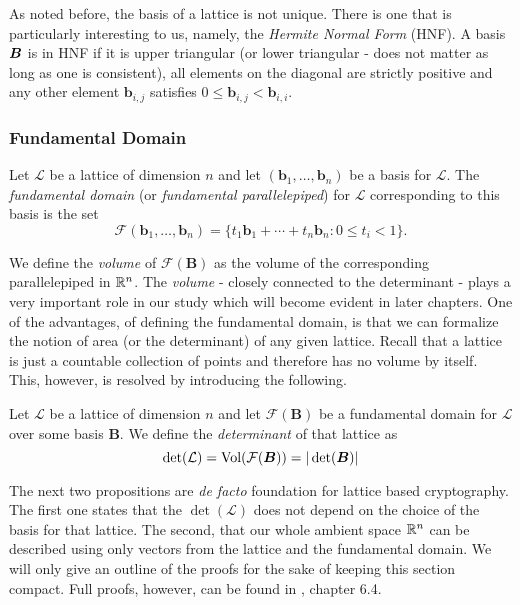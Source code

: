 As noted before, the basis of a lattice is not unique. There is one that is particularly interesting to us, namely, the \textit{Hermite Normal Form} (HNF). A basis $\boldsymbol{B}$ is in HNF if it is upper triangular (or lower triangular - does not matter as long as one is consistent), all elements on the diagonal are strictly positive and any other element $\bm{b}_{i,j}$ satisfies $0 \leq \bm{b}_{i,j} < \bm{b}_{i,i}$.

\subsubsection*{Fundamental Domain}
\begin{definition} \label{fundamental}
    Let $\mathcal{L}$ be a lattice of dimension $n$ and let $(\bm{b}_1, \dots, \bm{b}_n)$ be a basis for $\mathcal{L}$. The \textit{fundamental domain} (or \textit{fundamental parallelepiped}) for $\mathcal{L}$ corresponding to this basis is the set
    $$ \mathcal{F}(\bm{b}_1, \dots, \bm{b}_n) = \{t_1\bm{b}_1 + \cdots + t_n\bm{b}_n : 0 \leq t_i < 1 \}.$$
\end{definition}

We define the \textit{volume} of $\mathcal{F}(\bm{B})$ as the volume of the corresponding parallelepiped in $\mathbb{R}^n$. The \textit{volume} - closely connected to the determinant - plays a very important role in our study which will become evident in later chapters. One of the advantages, of defining the fundamental domain, is that we can formalize the notion of area (or the determinant) of any given lattice. Recall that a lattice is just a countable collection of points and therefore has no volume by itself. This, however, is resolved by introducing the following.

\begin{definition}
    Let $\mathcal{L}$ be a lattice of dimension $n$ and let $\mathcal{F}(\bm{B})$ be a fundamental domain for $\mathcal{L}$ over some basis $\bm{B}$. We define the \textit{determinant} of that lattice as
    $$ \det (\mathcal{L}) = \text{Vol}(\mathcal{F(\boldsymbol{B})}) = |\det (\boldsymbol{B}) |$$
\end{definition}

The next two propositions are \textit{de facto} foundation for lattice based cryptography. The first one states that the $\det (\mathcal{L})$ does not depend on the choice of the basis for that lattice. The second, that our whole ambient space $\mathbb{R}^n$ can be described using only vectors from the lattice and the fundamental domain. We will only give an outline of the proofs for the sake of keeping this section compact. Full proofs, however, can be found in \cite{book}, chapter 6.4.

